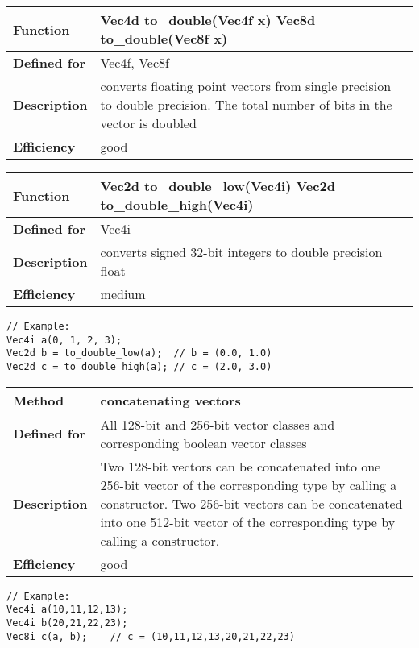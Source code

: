 \documentclass[vcl_manual.tex]{subfiles}
\begin{document}
\begin{tabular}{|p{30mm}|p{120mm}|}
\hline
\bfseries Function & 
Vec4d to\_double(Vec4f x) \newline
Vec8d to\_double(Vec8f x) \\ \hline
\bfseries Defined for & Vec4f, Vec8f \\ \hline
\bfseries Description & converts floating point vectors from single precision to double precision. The total number of bits in the vector is doubled \\ \hline
\bfseries Efficiency & good  \\ \hline
\end{tabular}


\begin{tabular}{|p{30mm}|p{120mm}|}
\hline
\bfseries Function & 
Vec2d to\_double\_low(Vec4i) \newline
Vec2d to\_double\_high(Vec4i) \\ \hline
\bfseries Defined for & Vec4i \\ \hline
\bfseries Description & converts signed 32-bit integers to double precision float \\ \hline
\bfseries Efficiency & medium \\ \hline
\end{tabular}
\begin{lstlisting}[frame=none]
// Example:
Vec4i a(0, 1, 2, 3);
Vec2d b = to_double_low(a);  // b = (0.0, 1.0)
Vec2d c = to_double_high(a); // c = (2.0, 3.0)
\end{lstlisting}


\begin{tabular}{|p{30mm}|p{120mm}|}
\hline
\bfseries Method & concatenating vectors \\ \hline
\bfseries Defined for & All 128-bit and 256-bit vector classes and corresponding boolean vector classes \\ \hline
\bfseries Description & Two 128-bit vectors can be concatenated into one 256-bit vector of the corresponding type by calling a constructor. \newline
Two 256-bit vectors can be concatenated into one 512-bit vector of the corresponding type by calling a constructor. \\ \hline
\bfseries Efficiency & good \\ \hline
\end{tabular}
\begin{lstlisting}[frame=none]
// Example:
Vec4i a(10,11,12,13);
Vec4i b(20,21,22,23);
Vec8i c(a, b);    // c = (10,11,12,13,20,21,22,23)
\end{lstlisting}
\end{document}
